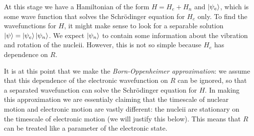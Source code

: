 At this stage we have a Hamiltonian of the form $H = H_e + H_n$ and
$\ket{\psi_e}$, which is some wave function that solves the Schr\"odinger
equation for $H_e$ only. To find the wavefunctions for $H$, it might make sense
to look for a separable solution $\ket{\psi} = \ket{\psi_e}\ket{\psi_n}$. We
expect $\ket{\psi_n}$ to contain some information about the vibration and
rotation of the nucleii. However, this is not so simple because $H_e$ has
dependence on $R$.

It is at this point that we make the \emph{Born-Oppenheimer approximation}: we
assume that this dependence of the electronic wavefunction on $R$ can be
ignored, so that a separated wavefunction can solve the Schr\"odinger equation
for $H$. In making this approximation we are essentialy claiming that the
timescale of nuclear motion and electronic motion are vastly different: the
nucleii are stationary on the timescale of electronic motion (we will justify
this below). This means that $R$ can be treated like a parameter of the
electronic state.
